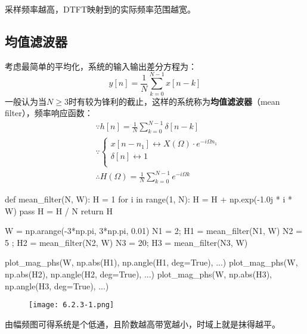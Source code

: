 \begin{tcolorbox}
采样频率越高，DTFT映射到的实际频率范围越宽。
\end{tcolorbox}

\subsection{均值滤波器}

考虑最简单的平均化，系统的输入输出差分方程为：
\[
y\left[ n \right] =\frac{1}{N}\sum_{k=0}^{N-1}{x\left[ n-k \right]}
\]
一般认为当$N\geqslant 3$时有较为锋利的截止，这样的系统称为{\bf 均值滤波器}（mean filter），频率响应函数：
\begin{align*}
&\because h\left[ n \right] =\frac{1}{N}\sum_{k=0}^{N-1}{\delta \left[ n-k \right]} \\
&\because \begin{cases}
	x\left[ n-n_1 \right] \leftrightarrow X\left( \varOmega \right) \cdot e^{-i\varOmega n_1}\\
	\delta \left[ n \right] \leftrightarrow 1\\
\end{cases} \\
&\therefore H\left( \varOmega \right) =\frac{1}{N}\sum_{k=0}^{N-1}{e^{-i\varOmega k}}
\end{align*}

\begin{python}
def mean_filter(N, W):
	H = 1
	for i in range(1, N):
		H = H + np.exp(-1.0j * i * W)
		pass
	H = H / N
	return H

W  = np.arange(-3*np.pi, 3*np.pi, 0.01)
N1 = 2;  H1 = mean_filter(N1, W)
N2 = 5 ; H2 = mean_filter(N2, W)
N3 = 20; H3 = mean_filter(N3, W)

plot_mag_phs(W, np.abs(H1), np.angle(H1, deg=True), ...)
plot_mag_phs(W, np.abs(H2), np.angle(H2, deg=True), ...)
plot_mag_phs(W, np.abs(H3), np.angle(H3, deg=True), ...)
\end{python}

\begin{figure}[h]
\centering
\texttt{[image: 6.2.3-1.png]}
\end{figure}

由幅频图可得系统是个低通，且阶数越高带宽越小，时域上就是抹得越平。




